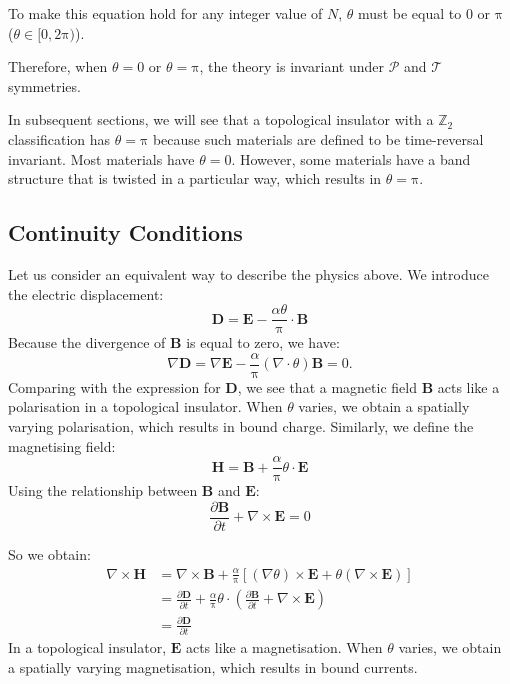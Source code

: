 To make this equation hold for any integer value of $N$, $\theta$ must be equal to $0$ or $\mathrm{\pi}$ ($\theta \in [0, 2\mathrm{\pi})$).

Therefore, when $\theta=0$ or $\theta=\mathrm{\pi}$, the theory is invariant under $\mathcal{P}$ and $\mathcal{T}$ symmetries.

In subsequent sections, we will see that a topological insulator with a $\mathbb{Z}_2$ classification has $\theta=\mathrm{\pi}$ because such materials are defined to be time-reversal invariant. Most materials have $\theta=0$. However, some materials have a band structure that is twisted in a particular way, which results in $\theta=\mathrm{\pi}$.

\subsection{Continuity Conditions}

Let us consider an equivalent way to describe the physics above. We introduce the electric displacement:
\begin{equation}
\bm{D} = \bm{E} - \frac{\alpha \theta}{\uppi} \cdot \bm{B}
\end{equation}
Because the divergence of $\bm{B}$ is equal to zero, we have:
\begin{equation}
\nabla \bm{D} = \nabla \bm{E} - \frac{\alpha}{\uppi} (\nabla \cdot \theta) \bm{B} = 0.
\end{equation}
Comparing with the expression for $\bm{D}$, we see that a magnetic field $\bm{B}$ acts like a polarisation in a topological insulator. When $\theta$ varies, we obtain a spatially varying polarisation, which results in bound charge. Similarly, we define the magnetising field:
\begin{equation}
\bm{H} = \bm{B} + \frac{\alpha}{\uppi} \theta \cdot \bm{E}
\end{equation}
Using the relationship between $\bm{B}$ and $\bm{E}$:
\begin{equation}
\frac{\partial \bm{B}}{\partial t} + \nabla \times \bm{E} = 0
\end{equation}

So we obtain:
\begin{equation}
\begin{aligned}
\nabla \times \bm{H} &= \nabla \times \bm{B} + \frac{\alpha}{\uppi} [ (\nabla \theta) \times \bm{E} + \theta (\nabla \times \bm{E}) ] \\
&= \frac{\partial \bm{D}}{\partial t} + \frac{\alpha}{\uppi} \theta \cdot (\frac{\partial \bm{B}}{\partial t} + \nabla \times \bm{E}) \\
&= \frac{\partial \bm{D}}{\partial t}
\end{aligned}
\end{equation}
In a topological insulator, $\bm{E}$ acts like a magnetisation. When $\theta$ varies, we obtain a spatially varying magnetisation, which results in bound currents.

